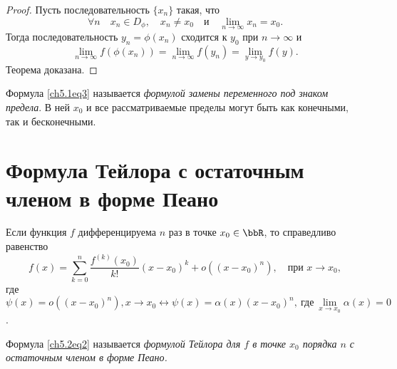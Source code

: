 \begin{proof}
Пусть последовательность $\{ x_n \}$ такая, что 
$$
\forall n \quad x_n \in D_{\phi}, \quad x_n \not= x_0 \quad \text{и} \quad \lim_{n \to \infty} x_n = x_0.
$$
Тогда последовательность $y_n = \phi(x_n)$ сходится к $y_0$ при $n \to \infty$ и 
$$
\lim_{n \to \infty} f(\phi(x_n)) = \lim_{n \to \infty} f(y_n) = \lim_{y \to y_0} f(y).
$$
Теорема доказана.
\end{proof}

Формула \eqref{ch5.1eq3} называется \textit{формулой замены переменного под знаком предела}. В ней $x_0$ и все рассматриваемые пределы могут быть как конечными, так и бесконечными.


\section{Формула Тейлора с остаточным членом в форме Пеано}

\begin{thm}
Если функция $f$ дифференцируема $n$ раз в точке $x_0 \in \bbR$, то справедливо равенство
\begin{equation} \label{ch5.2eq2}
f(x) = \sum_{k = 0}^{n} \frac{f^{(k)}(x_0)}{k!} (x - x_0)^k + o((x - x_0)^n), \quad \textit{при } x \to x_0,
\end{equation}
где $\psi(x) = o((x - x_0)^n), x \to x_0 \leftrightarrow \psi(x) = \alpha(x) (x - x_0)^n, \ \text{где}\ \lim\limits_{x \to x_0} \alpha(x) = 0$.
\end{thm}

Формула \eqref{ch5.2eq2} называется \textit{формулой Тейлора для $f$ в точке $x_0$ порядка $n$ с остаточным членом в форме Пеано.}

